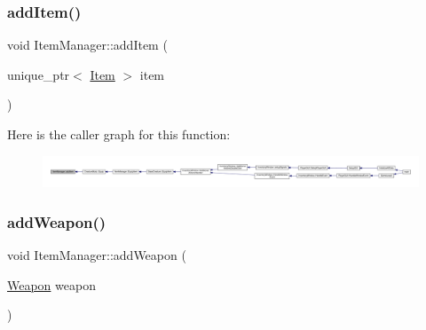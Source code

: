 \subsubsection{\texorpdfstring{add\+Item()}{addItem()}}
{\footnotesize\ttfamily void Item\+Manager\+::add\+Item (\begin{DoxyParamCaption}\item[{unique\+\_\+ptr$<$ \mbox{\hyperlink{class_item}{Item}} $>$}]{item }\end{DoxyParamCaption})}

Here is the caller graph for this function\+:
\nopagebreak
\begin{figure}[H]
\begin{center}
\leavevmode
\includegraphics[width=350pt]{dc/de1/class_item_manager_af86e2b751da18d6d142c29f8c4860323_icgraph}
\end{center}
\end{figure}
\mbox{\label{class_item_manager_a2631fb34c48555098029e18e66d7eb05}} 
\subsubsection{\texorpdfstring{add\+Weapon()}{addWeapon()}}
{\footnotesize\ttfamily void Item\+Manager\+::add\+Weapon (\begin{DoxyParamCaption}\item[{\mbox{\hyperlink{class_weapon}{Weapon}}}]{weapon }\end{DoxyParamCaption})}

